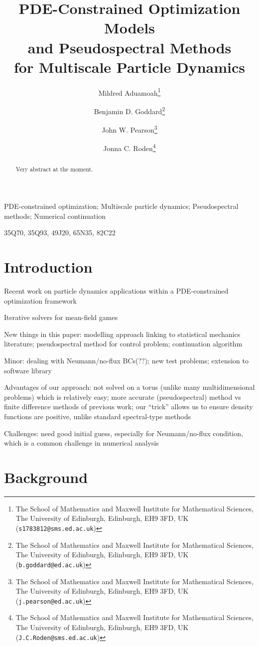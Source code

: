 \documentclass[final]{siamltex}
\title{PDE-Constrained Optimization Models \\ and Pseudospectral Methods \\ for Multiscale Particle Dynamics}
\author{Mildred Aduamoah\thanks{The School of Mathematics and Maxwell Institute for Mathematical Sciences, The University of Edinburgh, Edinburgh, EH9 3FD, UK ({\tt s1783812@sms.ed.ac.uk})} 
%
\and Benjamin D. Goddard\thanks{The School of Mathematics and Maxwell Institute for Mathematical Sciences, The University of Edinburgh, Edinburgh, EH9 3FD, UK ({\tt b.goddard@ed.ac.uk})} 
%
\and John W. Pearson\thanks{The School of Mathematics and Maxwell Institute for Mathematical Sciences, The University of Edinburgh, Edinburgh, EH9 3FD, UK ({\tt j.pearson@ed.ac.uk})} 
%
\and Jonna C. Roden\thanks{The School of Mathematics and Maxwell Institute for Mathematical Sciences, The University of Edinburgh, Edinburgh, EH9 3FD, UK ({\tt J.C.Roden@sms.ed.ac.uk})}}
\begin{document}
\maketitle

\begin{abstract}
Very abstract at the moment.
\end{abstract}

\begin{keywords}PDE-constrained optimization; Multiscale particle dynamics; Pseudospectral methods; Numerical continuation\end{keywords}

\begin{AMS}35Q70, 35Q93, 49J20, 65N35, 82C22\end{AMS}


\pagestyle{myheadings}
\thispagestyle{plain}


\section{Introduction}\label{sec:Intro}

Recent work on particle dynamics applications within a PDE-constrained optimization framework \cite{ABCK,ACFK,AlbiKalise,BonginiButtazo,BKS,CristianiPeri}

Iterative solvers for mean-field games \cite{AchdouPerez,Andreev}

New things in this paper: modelling approach linking to statistical mechanics literature; pseudospectral method for control problem; continuation algorithm

Minor: dealing with Neumann/no-flux BCs(??); new test problems; extension to software library

Advantages of our approach: not solved on a torus (unlike many multidimensional problems) which is relatively easy; more accurate (pseudospectral) method vs finite difference methods of previous work; our ``trick'' allows us to ensure density functions are positive, unlike standard spectral-type methods

Challenges: need good initial guess, especially for Neumann/no-flux condition, which is a common challenge in numerical analysis


\section{Background}\label{sec:Background}
\end{document}
